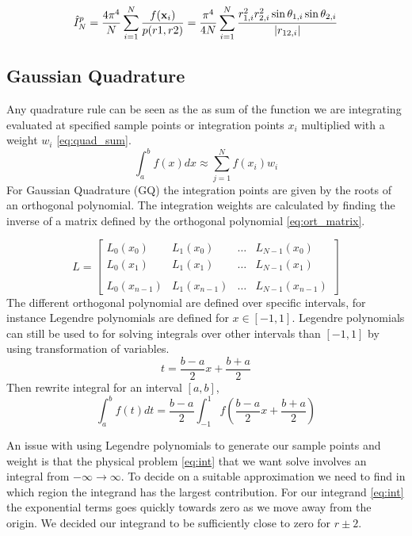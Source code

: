 \begin{equation}
  \label{eq:estimator_importance}
  \hat{I}_N^p
  = \frac{4\pi^4}{N} \sum_{i=1}^{N} \frac{f(\mathbf{x}_i)}{p(r1,r2)}
  = \frac{\pi^4}{4N} \sum_{i=1}^{N}
  \frac{r_{1,i}^2 r_{2,i}^2 \sin{\theta_{1,i}} \sin{\theta_{2,i}}}{\abs{r_{12,i}}}
\end{equation}


\subsection{Gaussian Quadrature}
Any quadrature rule can be seen as the as sum of the function we are
integrating evaluated at specified sample points or integration points $x_i$
multiplied with a weight $w_i$ \cref{eq:quad_sum}.
\begin{equation}\label{eq:quad_sum}
  \int_{a}^{b} f(x)dx \approx \sum_{j=1}^{N} f(x_i) w_i
\end{equation}
For Gaussian Quadrature (GQ) the
integration points are given by the roots of an orthogonal polynomial. The
integration weights are calculated by finding the inverse of a matrix defined by
the orthogonal polynomial \cref{eq:ort_matrix}.

\begin{equation}\label{eq:ort_matrix}
  L = \begin{bmatrix}
    L_0(x_0) & L_1(x_0) & \dots & L_{N-1}(x_{0}) \\
    L_0(x_1) & L_1(x_1) & \dots & L_{N-1}(x_{1}) \\
    \\
    L_0(x_{n-1}) & L_1(x_{n-1}) & \dots & L_{N-1}(x_{n-1})
  \end{bmatrix}
\end{equation}
The different orthogonal polynomial are defined over specific intervals, for
instance Legendre polynomials are defined for $x \in [-1, 1]$. Legendre
polynomials can still be used to for solving integrals over other intervals
than $[-1,1]$ by using transformation of variables.
\begin{equation}
  t = \frac{b-a}{2}x + \frac{b+a}{2}
\end{equation}
Then rewrite integral for an interval $[a,b]$,
\begin{equation}
  \int_a^b f(t)dt = \frac{b-a}{2}\int_{-1}^{1} f\left(\frac{b-a}{2}x + \frac{b+a}{2}\right)
\end{equation}

An issue with using Legendre polynomials to generate our sample points and
weight is that the physical problem \cref{eq:int} that we want solve involves an
integral from $-\infty \to \infty$. To decide on a suitable approximation we
need to find in which region the integrand has the largest contribution. For our
integrand \cref{eq:int} the exponential terms goes quickly towards zero as we
move away from the origin. We decided our integrand to be sufficiently close to
zero for $r \pm 2 $.

